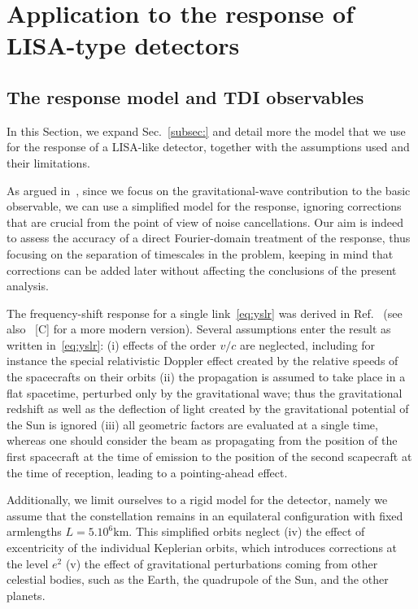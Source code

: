 \documentclass[aps,showpacs,twocolumn,
prd,superscriptaddress,nofootinbib]{revtex4-1}
\newcommand{\SM}[1]{{\color{Red} #1}}
\begin{document}

\section{Application to the response of LISA-type detectors}
\label{sec:LISA}


\subsection{The response model and TDI observables}
\label{subsec:modelLISA}

In this Section, we expand Sec.~\ref{subsec:} and detail more the model that we use for the response of a LISA-like detector, together with the assumptions used and their limitations.

As argued in~\cite{Krolak+04}, since we focus on the gravitational-wave contribution to the basic observable, we can use a simplified model for the response, ignoring corrections that are crucial from the point of view of noise cancellations. Our aim is indeed to assess the accuracy of a direct Fourier-domain treatment of the response, thus focusing on the separation of timescales in the problem, keeping in mind that corrections can be added later without affecting the conclusions of the present analysis.

The frequency-shift response for a single link~\eqref{eq:yslr} was derived in Ref.~\cite{EW75} (see also~\cite{} \SM{[C]} for a more modern version). Several assumptions enter the result as written in~\eqref{eq:yslr}: (i) effects of the order $v/c$ are neglected, including for instance the special relativistic Doppler effect created by the relative speeds of the spacecrafts on their orbits (ii) the propagation is assumed to take place in a flat spacetime, perturbed only by the gravitational wave; thus the gravitational redshift as well as the deflection of light created by the gravitational potential of the Sun is ignored (iii) all geometric factors are evaluated at a single time, whereas one should consider the beam as propagating from the position of the first spacecraft at the time of emission to the position of the second scapecraft at the time of reception, leading to a pointing-ahead effect.

Additionally, we limit ourselves to a rigid model for the detector, namely we assume that the constellation remains in an equilateral configuration with fixed armlengths $L=5.10^{6}\mathrm{km}$. This simplified orbits neglect (iv) the effect of excentricity of the individual Keplerian orbits, which introduces corrections at the level $e^{2}$ (v) the effect of gravitational perturbations coming from other celestial bodies, such as the Earth, the quadrupole of the Sun, and the other planets. 
\end{document}
